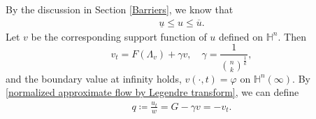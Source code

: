 \documentclass[reqno]{amsart}
\theoremstyle{remark}
\theoremstyle{definition}
\numberwithin{equation}{section}
\begin{document}
By the discussion in Section \ref{Barriers}, we know that 
\begin{align}\label{barriers}
    \underline{u} \leqslant u \leqslant \overline{u}.
\end{align}
Let $v$ be the corresponding support function of $u$ defined on $\mathbb H^n$. Then
\[
v_t = F(\Lambda_v)+\gamma v, \quad \gamma = \frac{1}{\binom{n}{k}^{\frac{1}{k}}},
\]
and the boundary value at infinity holds,
$
v(\cdot,t) = \varphi$ on  $\mathbb H^n(\infty).
$
By \eqref{normalized approximate flow by Legendre transform}, we can define
\begin{align}
    q \coloneqq \frac{u_t}{w} = G - \gamma v = -v_t.
\end{align}
\end{document}
